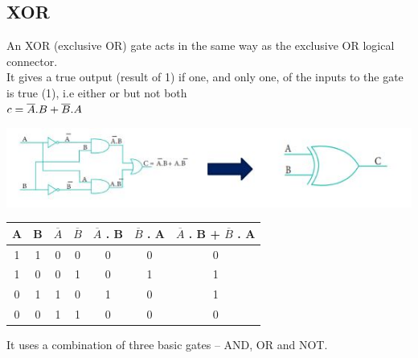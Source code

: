 \documentclass{article}
\begin{document}
\subsection{XOR}
An XOR (exclusive OR) gate acts in the same way as the exclusive OR logical connector. \\
It gives a true output (result of 1) if one, and only one, of the inputs to the gate is true (1), i.e either or but not both \\
\color{red}$\\ c = \overline{A}.B + \overline{B}.A$ \\ \color{black}
\begin{center} 
	\includegraphics{19}
\end{center}
\begin{table}[h!]
	\begin{center}
		\begin{tabular}{c|c|c|c|c|c|c}
			\textbf{A} & \textbf{B} & \textbf{$\overline{A}$} & \textbf{$\overline{B}$} & \textbf{$\overline{A}$ . B} & \textbf{$\overline{B}$ . A} & \textbf{$\overline{A}$ . B} + \textbf{$\overline{B}$ . A}\\
			\hline
			\cellcolor{blue!20}1 & \cellcolor{blue!20}1 & \cellcolor{blue!20}0 & \cellcolor{blue!20}0 & \cellcolor{blue!20}0 & \cellcolor{blue!20}0 & \cellcolor{blue!20}0\\
			\hline
			\cellcolor{blue!30}1 & \cellcolor{blue!30}0 & \cellcolor{blue!30}0 & \cellcolor{blue!30}1 & \cellcolor{blue!30}0 & \cellcolor{blue!30}1 & \cellcolor{blue!30}1\\
			\hline
			\cellcolor{blue!20}0 & \cellcolor{blue!20}1 & \cellcolor{blue!20}1 & \cellcolor{blue!20}0 & \cellcolor{blue!20}1 & \cellcolor{blue!20}0 & \cellcolor{blue!20}1\\
			\hline
			\cellcolor{blue!30}0 & \cellcolor{blue!30}0 & \cellcolor{blue!30}1 & \cellcolor{blue!30}1 & \cellcolor{blue!30}0 & \cellcolor{blue!30}0 & \cellcolor{blue!30}0\\
			\hline
		\end{tabular}
	\end{center}
\end{table} 
\color{red}It uses a combination of three basic gates – AND, OR and NOT. \\ \color{black}
\end{document}

